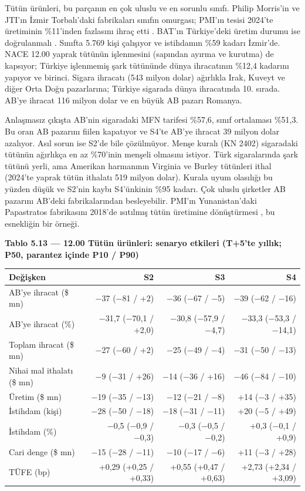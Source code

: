 Tütün ürünleri, bu parçanın en çok uluslu ve en sorunlu sınıfı. Philip Morris'in ve JTI'ın İzmir Torbalı'daki fabrikaları sınıfın omurgası; PMI'ın tesisi 2024'te üretiminin \%11'inden fazlasını ihraç etti \etiketV{}. BAT'ın Türkiye'deki üretim durumu ise doğrulanmalı \etiketD{}. Sınıfta 5.769 kişi çalışıyor ve istihdamın \%59 kadarı İzmir'de. NACE 12.00 yaprak tütünün işlenmesini (sapından ayırma ve kurutma) de kapsıyor; Türkiye işlenmemiş şark tütününde dünya ihracatının \%12,4 kadarını yapıyor ve birinci. Sigara ihracatı (543 milyon dolar) ağırlıkla Irak, Kuveyt ve diğer Orta Doğu pazarlarına; Türkiye sigarada dünya ihracatında 10. sırada. AB'ye ihracat 116 milyon dolar ve en büyük AB pazarı Romanya.

Anlaşmasız çıkışta AB'nin sigaradaki MFN tarifesi \%57,6, sınıf ortalaması \%51,3. Bu oran AB pazarını fiilen kapatıyor ve S4'te AB'ye ihracat 39 milyon dolar azalıyor. Asıl sorun ise S2'de bile çözülmüyor. Menşe kuralı (KN 2402) sigaradaki tütünün ağırlıkça en az \%70'inin menşeli olmasını istiyor. Türk sigaralarında şark tütünü yerli, ama Amerikan harmanının Virginia ve Burley tütünleri ithal (2024'te yaprak tütün ithalatı 519 milyon dolar). Kurala uyum olasılığı bu yüzden düşük \etiketH{} ve S2'nin kaybı S4'ünkinin \%95 kadarı. Çok uluslu şirketler AB pazarını AB'deki fabrikalarından besleyebilir. PMI'ın Yunanistan'daki Papastratos fabrikasını 2018'de ısıtılmış tütün üretimine dönüştürmesi \etiketV{}, bu esnekliğin bir örneği.


\textbf{Tablo 5.13 --- 12.00 Tütün ürünleri: senaryo etkileri (T+5'te yıllık; P50, parantez içinde P10 / P90)}

\nopagebreak[4]

\begingroup\gbtablo\small

\begin{longtable}[]{@{}lrrr@{}}
\toprule\noalign{}
\textbf{Değişken} & \textbf{S2} & \textbf{S3} & \textbf{S4} \\
\midrule\noalign{}
\endhead
\bottomrule\noalign{}
\endlastfoot
AB'ye ihracat (\$ mn) & −37 (−81 / +2) & −36 (−67 / −5) & −39 (−62 / −16) \\
AB'ye ihracat (\%) & −31,7 (−70,1 / +2,0) & −30,8 (−57,9 / −4,7) & −33,3 (−53,3 / −14,1) \\
Toplam ihracat (\$ mn) & −27 (−60 / +2) & −25 (−49 / −4) & −31 (−50 / −13) \\
Nihai mal ithalatı (\$ mn) & −9 (−31 / +26) & −14 (−36 / +16) & −46 (−84 / −10) \\
Üretim (\$ mn) & −19 (−35 / −13) & −12 (−21 / −8) & +14 (−3 / +35) \\
İstihdam (kişi) & −28 (−50 / −18) & −18 (−31 / −11) & +20 (−5 / +49) \\
İstihdam (\%) & −0,5 (−0,9 / −0,3) & −0,3 (−0,5 / −0,2) & +0,3 (−0,1 / +0,9) \\
Cari denge (\$ mn) & −15 (−28 / −11) & −10 (−17 / −6) & +11 (−3 / +28) \\
TÜFE (bp) & +0,29 (+0,25 / +0,33) & +0,55 (+0,47 / +0,63) & +2,73 (+2,34 / +3,09) \\
\end{longtable}

